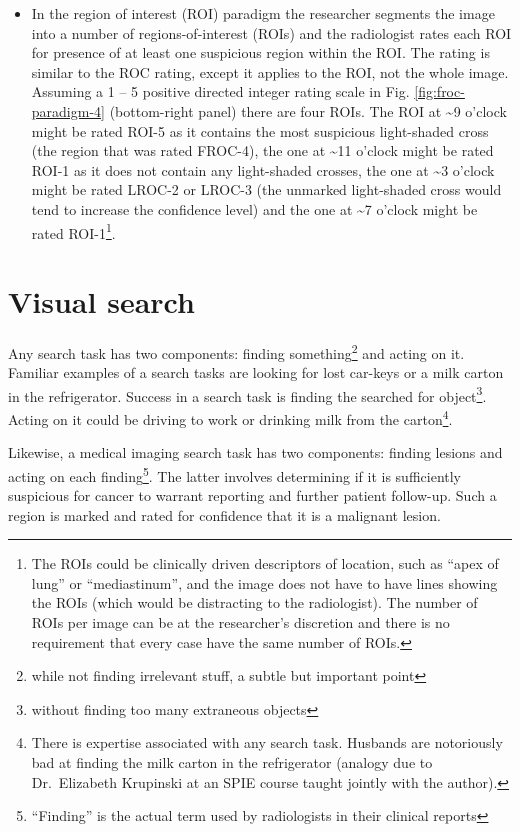 \documentclass[
]{book}
\begin{document}
\begin{itemize}
\item
  In the region of interest (ROI) paradigm the researcher segments the image into a number of regions-of-interest (ROIs) and the radiologist rates each ROI for presence of at least one suspicious region within the ROI. The rating is similar to the ROC rating, except it applies to the ROI, not the whole image. Assuming a 1 -- 5 positive directed integer rating scale in Fig. \ref{fig:froc-paradigm-4} (bottom-right panel) there are four ROIs. The ROI at \textasciitilde9 o'clock might be rated ROI-5 as it contains the most suspicious light-shaded cross (the region that was rated FROC-4), the one at \textasciitilde11 o'clock might be rated ROI-1 as it does not contain any light-shaded crosses, the one at \textasciitilde3 o'clock might be rated LROC-2 or LROC-3 (the unmarked light-shaded cross would tend to increase the confidence level) and the one at \textasciitilde7 o'clock might be rated ROI-1\footnote{The ROIs could be clinically driven descriptors of location, such as ``apex of lung'' or ``mediastinum'', and the image does not have to have lines showing the ROIs (which would be distracting to the radiologist). The number of ROIs per image can be at the researcher's discretion and there is no requirement that every case have the same number of ROIs.}.
\end{itemize}

\hypertarget{froc-paradigm-vis-search}{%
\section{Visual search}\label{froc-paradigm-vis-search}}

Any search task has two components: finding something\footnote{while not finding irrelevant stuff, a subtle but important point} and acting on it. Familiar examples of a search tasks are looking for lost car-keys or a milk carton in the refrigerator. Success in a search task is finding the searched for object\footnote{without finding too many extraneous objects}. Acting on it could be driving to work or drinking milk from the carton\footnote{There is expertise associated with any search task. Husbands are notoriously bad at finding the milk carton in the refrigerator (analogy due to Dr.~Elizabeth Krupinski at an SPIE course taught jointly with the author).}.

Likewise, a medical imaging search task has two components: finding lesions and acting on each finding\footnote{``Finding'' is the actual term used by radiologists in their clinical reports}. The latter involves determining if it is sufficiently suspicious for cancer to warrant reporting and further patient follow-up. Such a region is marked and rated for confidence that it is a malignant lesion.
\end{document}
